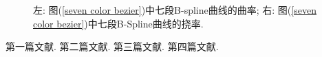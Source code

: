 \documentclass[utf8]{ctexart} %
\numberwithin{figure}{section}
\numberwithin{equation}{section}
\begin{document}
	\begin{figure}[h]
		\centering
		\begin{minipage}[b]{0.4\textwidth} %
			\centering
			
		\end{minipage}\hfill
		\begin{minipage}[b]{0.4\textwidth} %
			\centering
			
		\end{minipage}
		\caption{左: 图(\ref{seven color bezier})中七段B-spline曲线的曲率; 右: 图(\ref{seven color bezier})中七段B-Spline曲线的挠率. }
		\label{seven color bspline_table}
	\end{figure}
		
		
		\renewcommand\refname{参考文献}
		\begin{thebibliography}{100}%
				第一篇文献.
				第二篇文献.
				第三篇文献.
				第四篇文献.
		\end{thebibliography}  
\end{document}
